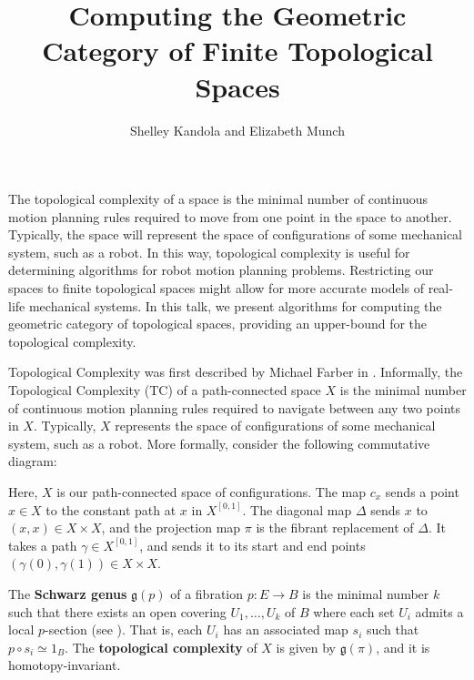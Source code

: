 \documentclass{article}
\title{Computing the Geometric Category of Finite Topological Spaces}
\author{Shelley Kandola and Elizabeth Munch}
\begin{document}
\maketitle

The topological complexity of a space is the minimal number of continuous motion planning rules required to move from one point in the space to another.
Typically, the space will represent the space of configurations of some mechanical system, such as a robot.
In this way, topological complexity is useful for determining algorithms for robot motion planning problems.
Restricting our spaces to finite topological spaces might allow for more accurate models of real-life mechanical systems.
In this talk, we present algorithms for computing the geometric category of topological spaces, providing an upper-bound for the topological complexity.



Topological Complexity was first described by Michael Farber in \cite{Farber2001}.
Informally, the Topological Complexity (TC) of a path-connected space $X$ is the minimal number of continuous motion planning rules required to navigate between any two points in $X$. Typically, $X$ represents the space of configurations of some mechanical system, such as a robot.
More formally, consider the following commutative diagram:

\begin{center}
\end{center}


Here, $X$ is our path-connected space of configurations.
The map $c_x$ sends a point $x\in X$ to the constant path at $x$ in $X^{[0,1]}$.
The diagonal map $\Delta$ sends $x$ to $(x,x)\in X \times X$, and the projection map $\pi$ is the fibrant replacement of $\Delta$.
It takes a path $\gamma \in X^{[0,1]}$, and sends it to its start and end points $(\gamma(0),\gamma(1)) \in X \times X$.

The {\bf Schwarz genus} $\mathfrak{g}(p)$ of a fibration $p:E \to B$ is the minimal number $k$ such that there exists an open covering $U_1,\hdots,U_k$ of $B$ where each set $U_i$ admits a local $p$-section (see \cite{Schwarz1958}).
That is, each $U_i$ has an associated map $s_i$ such that $p \circ s_i \simeq 1_B$. The \textbf{topological complexity} of $X$ is given by $\mathfrak{g}(\pi)$, and it is homotopy-invariant.
\end{document}
